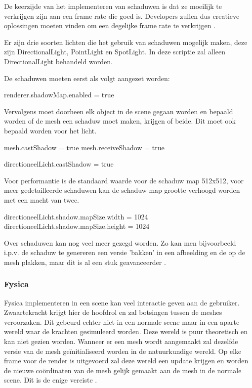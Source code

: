 De keerzijde van het implementeren van schaduwen is dat ze moeilijk te verkrijgen zijn aan een frame rate die goed is. Developers zullen dus creatieve oplossingen moeten vinden om een degelijke frame rate te verkrijgen \autocite{Simon2023}.

Er zijn drie soorten lichten die het gebruik van schaduwen mogelijk maken, deze zijn DirectionalLight, PointLight en SpotLight. In deze scriptie zal alleen DirectionalLight behandeld worden.

De schaduwen moeten eerst als volgt aangezet worden:

\begin{LVerbatim}
renderer.shadowMap.enabled = true
\end{LVerbatim}

Vervolgens moet doorheen elk object in de scene gegaan worden en bepaald worden of de mesh een schaduw moet maken, krijgen of beide. Dit moet ook bepaald worden voor het licht.

\begin{LVerbatim}
mesh.castShadow = true
mesh.receiveShadow = true

directioneelLicht.castShadow = true
\end{LVerbatim}

Voor performantie is de standaard waarde voor de schaduw map 512x512, voor meer gedetailleerde schaduwen kan de schaduw map grootte verhoogd worden met een macht van twee.

\begin{LVerbatim}
directioneelLicht.shadow.mapSize.width = 1024
directioneelLicht.shadow.mapSize.height = 1024
\end{LVerbatim}

Over schaduwen kan nog veel meer gezegd worden. Zo kan men bijvoorbeeld i.p.v. de schaduw te genereren een versie 'bakken' in een afbeelding en de op de mesh plakken, maar dit is al een stuk geavanceerder \autocite{Simon2023}.

\subsubsection{Fysica}

Fysica implementeren in een scene kan veel interactie geven aan de gebruiker. Zwaartekracht krijgt hier de hoofdrol en zal botsingen tussen de meshes veroorzaken. Dit gebeurd echter niet in een normale scene maar in een aparte wereld waar de krachten gesimuleerd worden. Deze wereld is puur theoretisch en kan niet gezien worden. Wanneer er een mesh wordt aangemaakt zal dezelfde versie van de mesh geïnitialiseerd worden in de natuurkundige wereld.
Op elke frame voor de render is uitgevoerd zal deze wereld een update krijgen en worden de nieuwe coördinaten van de mesh gelijk gemaakt aan de mesh in de normale scene. Dit is de enige vereiste \autocite{Simon2023}.

